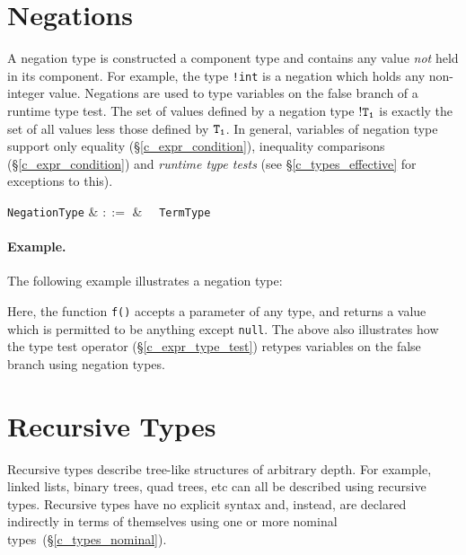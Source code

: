 
\section{Negations}
\label{c_types_negations}

A negation type is constructed a component type and contains any value {\em not} held in its component.  For example, the type \lstinline{!int} is a negation which holds any non-integer value.  Negations are used to type variables on the false branch of a runtime type test.  The set of values defined by a negation type ${\tt !T_1}$ is exactly the set of all values less those defined by ${\tt T_1}$.  In general, variables of negation type support only equality (\S\ref{c_expr_condition}), inequality comparisons (\S\ref{c_expr_condition}) and {\em runtime type tests} (see \S\ref{c_types_effective} for exceptions to this).

\begin{syntax}
  \verb+NegationType+ & $::=$ & \token{!}\ \ \verb+TermType+\\
\end{syntax}

\paragraph{Example.} The following example illustrates a negation type:



Here, the function \lstinline{f()} accepts a parameter of any type, and returns a value which is permitted to be anything except \lstinline{null}.  The above also illustrates how the type test operator (\S\ref{c_expr_type_test}) retypes variables on the false branch using negation types.

\section{Recursive Types}
\label{c_types_recursive}

Recursive types describe tree-like structures of arbitrary depth.  For example, linked lists, binary trees, quad trees, etc can all be described using recursive types.  Recursive types have no explicit syntax and, instead, are declared indirectly in terms of themselves using one or more nominal types~(\S\ref{c_types_nominal}).\\

